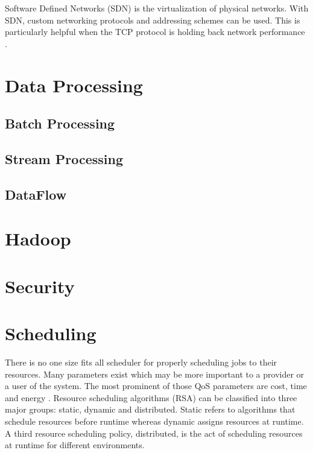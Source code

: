 \documentclass[fullapage,12pt]{article}
\begin{document}
Software Defined Networks (SDN) is the virtualization of physical networks. With SDN, custom networking protocols and addressing schemes can be used. This is particularly helpful when the TCP protocol is holding back network performance \cite{Jennings2015}.

\section{Data Processing} \label{sec:data-processing}


\subsection{Batch Processing} \label{sub:batch}


\subsection{Stream Processing} \label{sub:stream}

\subsection{DataFlow} \label{sub:dataflow}

\section{Hadoop} \label{sec:hadoop}

\section{Security} \label{sec:security}

\section{Scheduling} \label{sec:scheduling}

There is no one size fits all scheduler for properly scheduling jobs to their resources. Many parameters exist which may be more important to a provider or a user of the system. The most prominent of those QoS parameters are cost, time and energy \cite{Singh2016}. Resource scheduling algorithms (RSA) can be classified into three major groups: static, dynamic and distributed. Static refers to algorithms that schedule resources before runtime whereas dynamic assigns resources at runtime. A third resource scheduling policy, distributed, is the act of scheduling resources at runtime for different environments.
\end{document}
